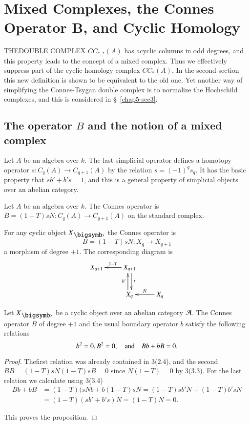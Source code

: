 \chapter[Mixed Complexes, the Connes Operator B, and ...]{Mixed
  Complexes, the Connes Operator B, and Cyclic 
  Homology}\label{chap5}

THE\pageoriginale DOUBLE COMPLEX $CC_{\ast,\ast}(A)$ has acyclic
columns in odd degrees, and this property leads to the concept of a
mixed complex. Thus we effectively suppress part of the cyclic
homology complex $CC_{\ast}(A)$. In the second section this new
definition is shown to be equivalent to the old one. Yet another way
of simplifying the Connes-Tsygan double complex is to normalize the
Hochschild complexes, and this is considered in \S\ \ref{chap5-sec3}.

\section{The operator $B$ and the notion of a mixed
  complex}\label{chap5-sec1}

Let $A$ be an algebra over $k$. The last simplicial operator defines a
homotopy operator $s:C_{q}(A)\to C_{q+1}(A)$ by the relation
$s=(-1)^{q}s_{q}$. It has the basic property that $sb'+b's=1$, and
this is a general property of simplicial objects over an abelian
category.

\begin{definition}\label{chap5-defi1.1}
Let $A$ be an algebra over $k$. The Connes operator is
$B=(1-T)sN:C_{q}(A)\to C_{q+1}(A)$ on the standard complex.
\end{definition}

For any cyclic object $X_{\bigdot}$ the Connes operator is
$$
B=(1-T)sN:X_{q}\to X_{q+1}
$$
a morphism of degree $+1$. The corresponding diagram is
\[
\xymatrix{
X_{q+1} & \ar[l]_{1-T} X_{q+1}\ar@<.25em>[d]^{s} & \\
 & X_{q}\ar@<.25em>[u]^{b'} & X_{q}\ar[l]_{N}
}
\]

\begin{proposition}\label{chap5-prop1.2}
Let $X_{\bigdot}$ be a cyclic object over an abelian category
$\mathcal{A}$. The Connes operator $B$ of degree $+1$ and the usual boundary
operator $b$ satisfy the following relations
$$
b^{2}=0,B^{2}=0,\quad\text{and}\quad Bb+bB=0.
$$
\end{proposition}

\begin{proof}
The\pageoriginale first relation was already contained in 3(2.4), and
the second $BB=(1-T)sN(1-T)sB=0$ since $N(1-T)=0$ by 3(3.3). For the
last relation we calculate using 3(3.4)
\begin{align*}
Bb+bB &= (1-T)(sNb+b(1-T)sN=(1-T)sb'N+(1-T)b'sN\\
      &= (1-T)(sb'+b's)N=(1-T)N=0.
\end{align*}

This proves the proposition.
\end{proof}

